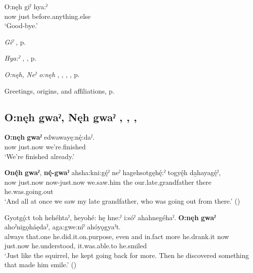 \ea
\label{ex:opart33}
\gll O:nęh giˀ hya:ˀ\\
now just before.anything.else\\
\glt ‘Good-bye.’
\z

\begin{CayugaRelated}
\item \textit{Giˀ} , p. \pageref{p:[giˀ]}\\
\item \textit{Hya:ˀ} , , p. \pageref{p:[hya:ˀ]}\\
\item \textit{O:nęh, Neˀ o:nęh} , , , , p. \pageref{p:[o:nęh]}\\
\item Greetings, origins, and affiliations, p. \pageref{ch:greetings, origins, and affiliations}
\end{CayugaRelated}



\subsection*{\textbf{O:nęh gwaˀ, Nęh gwaˀ} , , , } \label{p:[o:nęh gwaˀ]}

\ea
\label{ex:opart34}
\gll \textbf{O:nęh} \textbf{gwaˀ} edwawayę:nę́:daˀ.\\
now just.now we’re.finished\\
\glt ‘We’re finished already.’
\z

\ea
\label{ex:opart35}
\gll \textbf{Onę́h} \textbf{gwaˀ}, \textbf{nę́-gwaˀ} ahsha:kni:gę́ˀ neˀ hagehsotgęhę́:ˀ togyę́h da̱hayagę́ˀ,\\
now just.now now-just.now we.saw.him the our.late.grandfather there he.was.going.out\\
\glt ‘And all at once we saw my late grandfather, who was going out from there.’ (\cite{henry_de_2005})
\z

\ea
\label{ex:opart36}
\gll Gyotgǫ́:t toh hehéhtaˀ, heyohé: hę hne:ˀ i:sóˀ ahahnegéhaˀ. \textbf{O:nęh} \textbf{gwaˀ} ahoˀnigǫháędaˀ, aga:gwe:níˀ ahóyǫgyaˀt.\\
always that.one he.did.it.on.purpose, even and in.fact more he.drank.it now just.now he.understood, it.was.able.to he.smiled\\
\glt ‘Just like the squirrel, he kept going back for more. Then he discovered something that made him smile.’ (\cite{carrier_legends_2013})
\z


